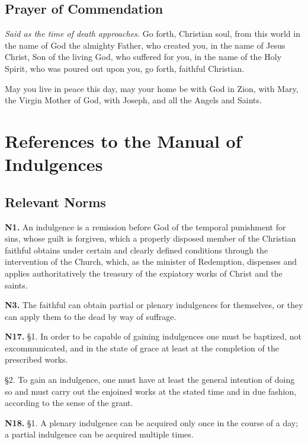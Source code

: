\documentclass[12pt]{article}
\newcommand{\prayertitle}[1]{\subsection{#1}}
\newcommand{\note}[1]{{\small{\textsl{#1}}}\newline}
\begin{document}
\prayertitle{Prayer of Commendation}
\note{Said as the time of death approaches.}
Go forth, Christian soul, from this world in the name of God the almighty Father, who created you, in the name of Jesus Christ, Son of the living God, who suffered for you, in the name of the Holy Spirit, who was poured out upon you, go forth, faithful Christian.

May you live in peace this day, may your home be with God in Zion, with Mary, the Virgin Mother of God, with Joseph, and all the Angels and Saints.


\newpage
\appendix
\section{References to the Manual of Indulgences}
\subsection{Relevant Norms}
\newcommand{\norm}[1]{\textbf{N#1.}\newline}
\newcommand{\subnorm}[1]{§#1.}
\norm{1}
An indulgence is a remission before God of the temporal punishment for sins, whose guilt is forgiven, which a properly disposed member of the Christian faithful obtains under certain and clearly defined conditions through the intervention of the Church, which, as the minister of Redemption, dispenses and applies authoritatively the treasury of the expiatory works of Christ and the saints.

\norm{3}
The faithful can obtain partial or plenary indulgences for themselves, or they can apply them to the dead by way of suffrage.

\norm{17}
\subnorm{1} In order to be capable of gaining indulgences one must be baptized, not excommunicated, and in the state of grace at least at the completion of the prescribed works.

\subnorm{2} To gain an indulgence, one must have at least the general intention of doing so and must carry out the enjoined works at the stated time and in due fashion, according to the sense of the grant.

\norm{18}
\subnorm{1} A plenary indulgence can be acquired only once in the course of a day; a partial indulgence can be acquired multiple times.
\end{document}

